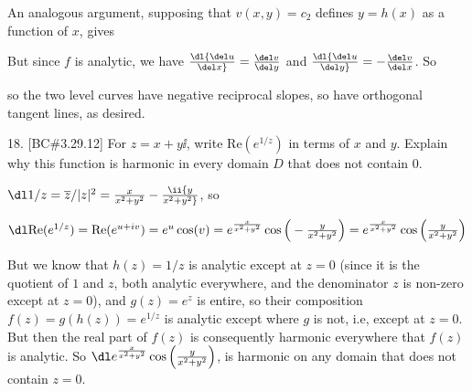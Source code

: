 \item{} An analogous argument, supposing that $v(x,y)=c_2$ defines $y=h(x)$ as a function of $x$,
gives

\ssk


\ssk

\item{} But since $f$ is analytic, we have $\dl {{\del u}\over{\del x}}={{\del v}\over{\del y}}$
and $\dl {{\del u}\over{\del y}}=-{{\del v}\over{\del x}}$. 
So 

\ssk


\ssk

\item{} so the two level curves have negative reciprocal slopes, so have orthogonal
tangent lines, as desired.


\bsk


\item{18.} [BC\#3.29.12] For $z=x+y\ii$, write $\text{Re}(e^{1/z})$ in terms of $x$ and $y$. Explain why
this function is harmonic in every domain $D$ that does not contain $0$.
 

\msk

\item{} $\dl 1/z=\overline{z}/|z|^2= {{x}\over{x^2+y^2}}-\ii{{y}\over{x^2+y^2}}$, so 


\item{} $\dl \text{Re}(e^{1/z})=\text{Re}(e^{u+iv})=e^u\cos(v)
=e^{{{x}\over{x^2+y^2}}}\cos\Big(-{{y}\over{x^2+y^2}}\Big)
=e^{{{x}\over{x^2+y^2}}}\cos\Big({{y}\over{x^2+y^2}}\Big)$

\msk

\item{} But we know that $h(z)=1/z$ is analytic except at $z=0$ (since it is the quotient of $1$ and $z$, both
analytic everywhere, and the denominator $z$ is non-zero except at $z=0$), and $g(z)=e^z$ is entire,
so their composition $f(z)=g(h(z))=e^{1/z}$ is analytic except where $g$ is not, i.e, except 
at $z=0$. But then the real part of $f(z)$ is consequently harmonic everywhere that $f(z)$ is
analytic. So $\dl e^{{{x}\over{x^2+y^2}}}\cos\Big({{y}\over{x^2+y^2}}\Big)$, is harmonic
on any domain that does not contain $z=0$.

